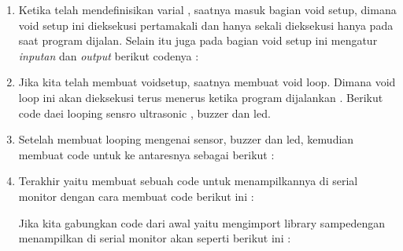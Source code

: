 \begin{enumerate}
\begin{enumerate}
    \item Ketika telah mendefinisikan varial , saatnya masuk bagian void setup, dimana void setup ini dieksekusi pertamakali dan hanya sekali dieksekusi hanya pada saat program dijalan. Selain itu juga pada bagian void setup ini mengatur \textit{inputan} dan \textit{output} berikut codenya :
    
        
     \item Jika kita telah membuat voidsetup, saatnya membuat void loop. Dimana void loop ini akan dieksekusi terus menerus ketika program dijalankan . Berikut code daei looping sensro ultrasonic , buzzer dan led.
     
        
    \item Setelah membuat looping mengenai sensor, buzzer dan led, kemudian membuat code untuk ke antaresnya sebagai berikut :
    
    \item Terakhir yaitu membuat sebuah code untuk menampilkannya di serial monitor dengan cara membuat code berikut ini :
    
    
    \par Jika kita gabungkan code dari awal yaitu mengimport library sampedengan menampilkan di serial monitor akan seperti berikut ini :
    
        
    \end{enumerate}
    

\end{enumerate}
